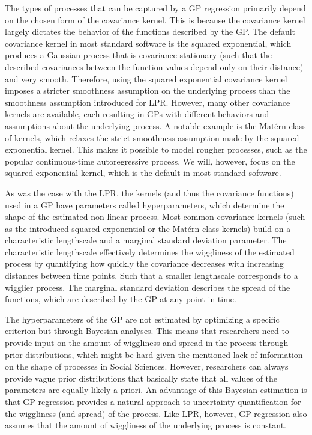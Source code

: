 \documentclass[man, floatsintext]{apa7}
\begin{document}
\noindent The types of processes that can be captured by a GP regression
primarily depend on the chosen form of the covariance kernel. This is because
the covariance kernel largely dictates the behavior of the functions described
by the GP\@. The default covariance kernel in most standard software is the
squared exponential, which produces a Gaussian process that is covariance
stationary (such that the described covariances between the function values
depend only on their distance) and very smooth. Therefore, using the squared
exponential covariance kernel imposes a stricter smoothness assumption on the
underlying process than the smoothness assumption introduced for LPR\@.
However, many other covariance kernels are available, each resulting in GPs
with different behaviors and assumptions about the underlying process. A
notable example is the Matérn class of kernels, which relaxes the strict
smoothness assumption made by the squared exponential kernel. This makes it
possible to model rougher processes, such as the popular continuous-time
autoregressive process. We will, however, focus on the squared exponential
kernel, which is the default in most standard software.

As was the case with the LPR, the kernels (and thus the covariance functions)
used in a GP have parameters called hyperparameters, which determine the shape
of the estimated non-linear process. Most common covariance kernels (such as
the introduced squared exponential or the Matérn class kernels) build on a
characteristic lengthscale and a marginal standard deviation parameter. The
characteristic lengthscale effectively determines the wiggliness of the
estimated process by quantifying how quickly the covariance decreases with
increasing distances between time points. Such that a smaller lengthscale
corresponds to a wigglier process. The marginal standard deviation describes
the spread of the functions, which are described by the GP at any point in
time.

The hyperparameters of the GP are not estimated by optimizing a specific
criterion but through Bayesian analyses. This means that researchers need to
provide input on the amount of wiggliness and spread in the process through
prior distributions, which might be hard given the mentioned lack of
information on the shape of processes in Social Sciences. However,
researchers can always provide vague prior distributions that basically state
that all values of the parameters are equally likely a-priori. An advantage of
this Bayesian estimation is that GP regression provides a natural approach to
uncertainty quantification for the wiggliness (and spread) of the process. Like
LPR, however, GP regression also assumes that the amount of wiggliness of
the underlying process is constant.
\end{document}
